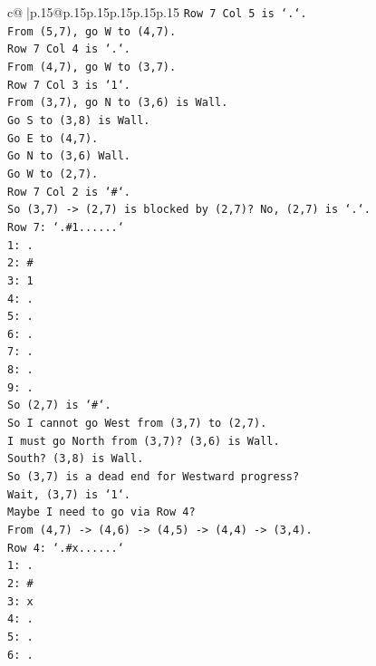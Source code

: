 \documentclass{article}
\begin{document}
{\begin{supertabular}{c@{$\;$}|p{.15\linewidth}@{}p{.15\linewidth}p{.15\linewidth}p{.15\linewidth}p{.15\linewidth}p{.15\linewidth}}
{{{\texttt{Row 7 Col 5 is `.`.} \\
\texttt{From (5,7), go W to (4,7).} \\
\texttt{Row 7 Col 4 is `.`.} \\
\texttt{From (4,7), go W to (3,7).} \\
\texttt{Row 7 Col 3 is `1`.} \\
\texttt{From (3,7), go N to (3,6) is Wall.} \\
\texttt{Go S to (3,8) is Wall.} \\
\texttt{Go E to (4,7).} \\
\texttt{Go N to (3,6) Wall.} \\
\texttt{Go W to (2,7).} \\
\texttt{Row 7 Col 2 is `\#`.} \\
\texttt{So (3,7) {-}> (2,7) is blocked by (2,7)? No, (2,7) is `.`.} \\
\texttt{Row 7: `.\#1......`} \\
\texttt{1: .} \\
\texttt{2: \#} \\
\texttt{3: 1} \\
\texttt{4: .} \\
\texttt{5: .} \\
\texttt{6: .} \\
\texttt{7: .} \\
\texttt{8: .} \\
\texttt{9: .} \\
\texttt{So (2,7) is `\#`.} \\
\texttt{So I cannot go West from (3,7) to (2,7).} \\
\texttt{I must go North from (3,7)? (3,6) is Wall.} \\
\texttt{South? (3,8) is Wall.} \\
\texttt{So (3,7) is a dead end for Westward progress?} \\
\texttt{Wait, (3,7) is `1`.} \\
\texttt{Maybe I need to go via Row 4?} \\
\texttt{From (4,7) {-}> (4,6) {-}> (4,5) {-}> (4,4) {-}> (3,4).} \\
\texttt{Row 4: `.\#x......`} \\
\texttt{1: .} \\
\texttt{2: \#} \\
\texttt{3: x} \\
\texttt{4: .} \\
\texttt{5: .} \\
\texttt{6: .} \\
}}}
\end{supertabular}}
\end{document}
